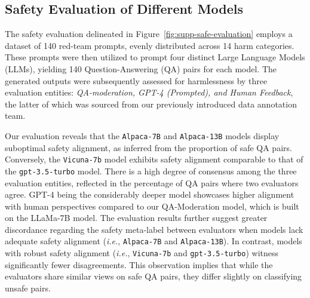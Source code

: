 \clearpage
\subsection{Safety Evaluation of Different Models}
The safety evaluation delineated in Figure~\ref{fig:supp-safe-evaluation} employs a dataset of 140 red-team prompts, evenly distributed across 14 harm categories. These prompts were then utilized to prompt four distinct Large Language Models (LLMs), yielding 140 Question-Answering (QA) pairs for each model. The generated outputs were subsequently assessed for harmlessness by three evaluation entities: \textit{QA-moderation, GPT-4 (Prompted), and Human Feedback}, the latter of which was sourced from our previously introduced data annotation team.

Our evaluation reveals that the \texttt{Alpaca-7B} and \texttt{Alpaca-13B} models display suboptimal safety alignment, as inferred from the proportion of safe QA pairs. Conversely, the \texttt{Vicuna-7b} model exhibits safety alignment comparable to that of the \texttt{gpt-3.5-turbo} model. There is a high degree of consensus among the three evaluation entities, reflected in the percentage of QA pairs where two evaluators agree. GPT-4 being the considerably deeper model showcases higher alignment with human perspectives compared to our QA-Moderation model, which is built on the LLaMa-7B model. The evaluation results further suggest greater discordance regarding the safety meta-label between evaluators when models lack adequate safety alignment (\textit{i.e.}, \texttt{Alpaca-7B} and \texttt{Alpaca-13B}). In contrast, models with robust safety alignment (\textit{i.e.}, \texttt{Vicuna-7b} and \texttt{gpt-3.5-turbo}) witness significantly fewer disagreements. This observation implies that while the evaluators share similar views on safe QA pairs, they differ slightly on classifying unsafe pairs.

